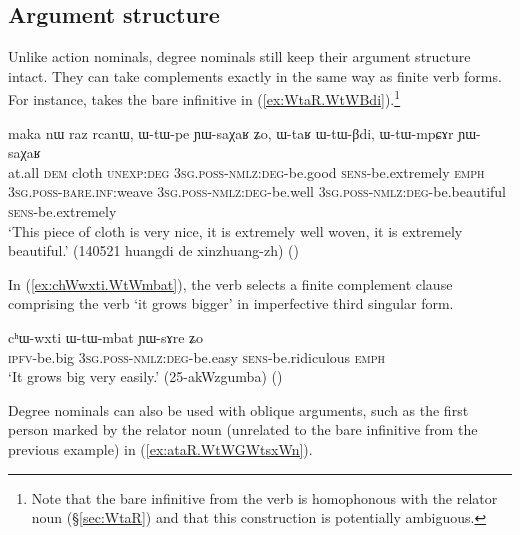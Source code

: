 \subsection{Argument structure} \label{sec:degree.nominal.arguments}
Unlike action nominals, degree nominals still keep their argument structure intact. They can take complements exactly in the same way as finite verb forms. For instance,  takes the bare infinitive  in (\ref{ex:WtaR.WtWBdi}).\footnote{Note that the bare infinitive  from the verb  is homophonous with the relator noun  (§\ref{sec:WtaR}) and that this construction is potentially ambiguous. }

\begin{exe}
\ex \label{ex:WtaR.WtWBdi}
\gll maka nɯ raz rcanɯ, ɯ-tɯ-pe ɲɯ-saχaʁ ʑo, ɯ-taʁ ɯ-tɯ-βdi, ɯ-tɯ-mpɕɤr ɲɯ-saχaʁ \\
at.all \textsc{dem} cloth \textsc{unexp}:\textsc{deg}  \textsc{3sg}.\textsc{poss}-\textsc{nmlz}:\textsc{deg}-be.good \textsc{sens}-be.extremely \textsc{emph} \textsc{3sg}.\textsc{poss}-\textsc{bare}.\textsc{inf}:weave  \textsc{3sg}.\textsc{poss}-\textsc{nmlz}:\textsc{deg}-be.well \textsc{3sg}.\textsc{poss}-\textsc{nmlz}:\textsc{deg}-be.beautiful \textsc{sens}-be.extremely \\
\glt `This piece of cloth is very nice, it is extremely well woven, it is extremely beautiful.' (140521 huangdi de xinzhuang-zh)
()
\end{exe}

In (\ref{ex:chWwxti.WtWmbat}), the verb  selects a finite complement clause comprising the verb  `it grows bigger' in imperfective third singular form.

\begin{exe}
\ex \label{ex:chWwxti.WtWmbat}
\gll cʰɯ-wxti ɯ-tɯ-mbat ɲɯ-sɤre ʑo \\
\textsc{ipfv}-be.big  \textsc{3sg}.\textsc{poss}-\textsc{nmlz}:\textsc{deg}-be.easy \textsc{sens}-be.ridiculous \textsc{emph} \\ 
\glt `It grows big very easily.' (25-akWzgumba) ()
\end{exe}

Degree nominals can also be used with oblique arguments, such as the first person marked by the relator noun  (unrelated to the bare infinitive  from the previous example) in (\ref{ex:ataR.WtWGWtsxWn}).


